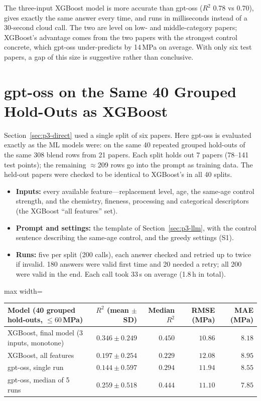 \documentclass[11pt]{article}
\newcommand{\R}{$R^2$}
\begin{document}
\noindent The three-input XGBoost model is more accurate than gpt-oss (\R{} 0.78 vs
0.70), gives exactly the same answer every time, and runs in milliseconds instead of a
30-second cloud call. The two are level on low- and middle-category papers; XGBoost's
advantage comes from the two papers with the strongest control concrete, which gpt-oss
under-predicts by 14\,MPa on average. With only six test papers, a gap of this size is
suggestive rather than conclusive.

\section{gpt-oss on the Same 40 Grouped Hold-Outs as XGBoost}
\label{sec:p3-matched-cv}
Section~\ref{sec:p3-direct} used a single split of six papers. Here gpt-oss is evaluated
exactly as the ML models were: on the same 40 repeated grouped hold-outs of the same 308
blend rows from 21 papers. Each split holds out 7 papers (78--141 test points); the
remaining $\approx$209 rows go into the prompt as training data. The held-out papers were
checked to be identical to XGBoost's in all 40 splits.
\begin{itemize}\itemsep1pt
  \item \textbf{Inputs:} every available feature---replacement level, age, the same-age
        control strength, and the chemistry, fineness, processing and categorical
        descriptors (the XGBoost ``all features'' set).
  \item \textbf{Prompt and settings:} the template of Section~\ref{sec:p3-llm}, with the
        control sentence describing the same-age control, and the greedy settings (S1).
  \item \textbf{Runs:} five per split (200 calls), each answer checked and retried up to
        twice if invalid. 180 answers were valid first time and 20 needed a retry; all
        200 were valid in the end. Each call took 33\,s on average (1.8\,h in total).
\end{itemize}

\begin{center}\small
\begin{adjustbox}{max width=\linewidth}
\begin{tabular}{lrrrr}
\toprule
Model (40 grouped hold-outs, $\leq60$\,MPa) & \R{} (mean $\pm$ SD) & Median \R{} & RMSE (MPa) & MAE (MPa) \\
\midrule
XGBoost, final model (3 inputs, monotone) & $\mathbf{0.346\pm0.249}$ & $\mathbf{0.450}$ & $\mathbf{10.86}$ & $8.18$ \\
XGBoost, all features & $0.197\pm0.254$ & $0.229$ & $12.08$ & $8.95$ \\
gpt-oss, single run & $0.144\pm0.597$ & $0.294$ & $11.94$ & $8.55$ \\
\rowcolor{green!12}gpt-oss, median of 5 runs & $0.259\pm0.518$ & $0.444$ & $11.10$ & $\mathbf{7.85}$ \\
\bottomrule
\end{tabular}
\end{adjustbox}
\end{center}
\end{document}
